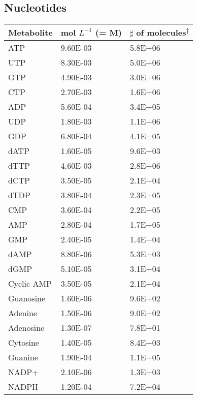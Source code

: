 \documentclass{article}
\begin{document}
        \subsection{Nucleotides}
            \begin{tabular}{ |l|l|l| } %
                \hline
                Metabolite & mol $L^{-1}$ (= M) & $\sharp$ of molecules\textsuperscript{$\dagger$} \\ 
                \hline
                ATP & \num{9.60E-03}  &  \num{5.8E+06}    \\
                UTP & \num{8.30E-03}  &  \num{5.0E+06}    \\
                GTP & \num{4.90E-03}  &  \num{3.0E+06}    \\
                CTP & \num{2.70E-03}  &  \num{1.6E+06}    \\
                ADP & \num{5.60E-04}  &  \num{3.4E+05}    \\
                UDP & \num{1.80E-03}  &  \num{1.1E+06}    \\
                GDP & \num{6.80E-04}  &  \num{4.1E+05}    \\
                dATP    & \num{1.60E-05}  &     \num{9.6E+03}   \\
                dTTP    & \num{4.60E-03}  &     \num{2.8E+06}   \\
                dCTP    & \num{3.50E-05}  &     \num{2.1E+04}   \\
                dTDP    & \num{3.80E-04}  &     \num{2.3E+05}   \\
                CMP & \num{3.60E-04}  &  \num{2.2E+05}    \\
                AMP & \num{2.80E-04}  &  \num{1.7E+05}    \\
                GMP & \num{2.40E-05}  &  \num{1.4E+04}    \\
                dAMP    & \num{8.80E-06}  &     \num{5.3E+03}   \\
                dGMP    & \num{5.10E-05}  &     \num{3.1E+04}   \\
                Cyclic AMP  & \num{3.50E-05}  &   \num{2.1E+04} \\
                Guanosine   & \num{1.60E-06}  &    \num{9.6E+02}  \\
                Adenine & \num{1.50E-06}  &  \num{9.0E+02}    \\
                Adenosine   & \num{1.30E-07}  &    \num{7.8E+01}  \\
                Cytosine    & \num{1.40E-05}  &     \num{8.4E+03}   \\
                Guanine & \num{1.90E-04}  &  \num{1.1E+05}    \\
                NADP+   & \num{2.10E-06}  &    \num{1.3E+03}  \\
                NADPH   & \num{1.20E-04}  &    \num{7.2E+04}  \\
                \hline
            \end{tabular}
\end{document}

